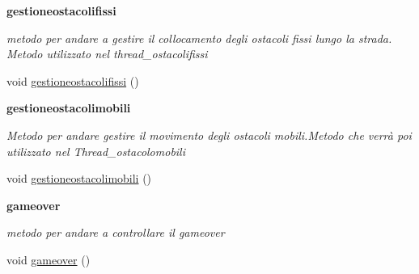 \begin{Indent}\textbf{ gestioneostacolifissi}\par
{\em metodo per andare a gestire il collocamento degli ostacoli fissi lungo la strada. Metodo utilizzato nel thread\+\_\+ostacolifissi }\begin{DoxyCompactItemize}
\item 
void \hyperlink{classcargame_1_1condivisa_aa89c1eb296290580066c78298dd31f69}{gestioneostacolifissi} ()
\end{DoxyCompactItemize}
\end{Indent}
\begin{Indent}\textbf{ gestioneostacolimobili}\par
{\em Metodo per andare gestire il movimento degli ostacoli mobili.\+Metodo che verrà poi utilizzato nel Thread\+\_\+ostacolomobili }\begin{DoxyCompactItemize}
\item 
void \hyperlink{classcargame_1_1condivisa_a043c474a3bfdf39e53cb851da09ea68e}{gestioneostacolimobili} ()
\end{DoxyCompactItemize}
\end{Indent}
\begin{Indent}\textbf{ gameover}\par
{\em metodo per andare a controllare il gameover }\begin{DoxyCompactItemize}
\item 
void \hyperlink{classcargame_1_1condivisa_a66865cebbc04c361135576c98005b741}{gameover} ()
\end{DoxyCompactItemize}
\end{Indent}
